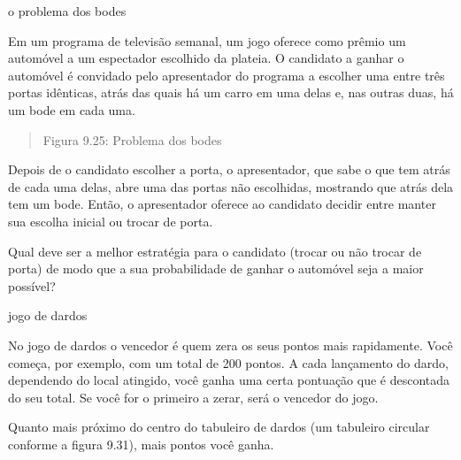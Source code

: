 \label{\detokenize{PE511-5:sec-praticando-propriedades}}\label{\detokenize{PE511-5::doc}}\label{\detokenize{PE511-5:praticando-probabilidade-regras-basicas-e-propriedades}}\begin{task}{o problema dos bodes}
\label{ativ-problema-dos-bodes}

Em um programa de televisão semanal, um jogo oferece como prêmio um automóvel a um espectador escolhido da plateia. O candidato a ganhar o automóvel é convidado pelo apresentador do programa a escolher uma entre três portas idênticas, atrás das quais há um carro em uma delas e, nas outras duas, há um bode em cada uma.
\begin{quote}

\begin{figure}[H]
\centering

\noindent{}
\end{figure}

Figura 9.25: Problema dos bodes
\end{quote}

Depois de o candidato escolher a porta, o apresentador, que sabe o que tem atrás de cada uma delas, abre uma das portas não escolhidas, mostrando que atrás dela tem um bode. Então, o apresentador oferece ao candidato decidir entre manter sua escolha inicial ou trocar de porta.

Qual deve ser a melhor estratégia para o candidato (trocar ou não trocar de porta) de modo que a sua probabilidade de ganhar o automóvel seja a maior possível?
\end{task}
\begin{task}{jogo de dardos}
\label{ativ-probabilidade-geometrica}

\end{task}

No jogo de dardos o vencedor é quem zera os seus pontos mais rapidamente. Você começa, por exemplo, com um total de 200 pontos. A cada lançamento do dardo, dependendo do local atingido, você ganha uma certa pontuação que é descontada do seu total. Se você for o primeiro a zerar, será o vencedor do jogo.

Quanto mais próximo do centro do tabuleiro de dardos (um tabuleiro circular conforme a figura 9.31), mais pontos você ganha.

